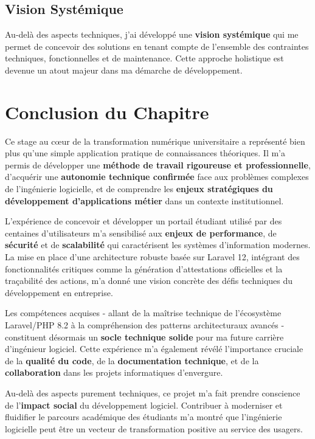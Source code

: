 \documentclass[12pt,a4paper]{report}
\begin{document}
\subsection{Vision Systémique}

Au-delà des aspects techniques, j'ai développé une \textbf{vision systémique} qui me permet de concevoir des solutions en tenant compte de l'ensemble des contraintes techniques, fonctionnelles et de maintenance. Cette approche holistique est devenue un atout majeur dans ma démarche de développement.

\section*{Conclusion du Chapitre}

Ce stage au cœur de la transformation numérique universitaire a représenté bien plus qu'une simple application pratique de connaissances théoriques. Il m'a permis de développer une \textbf{méthode de travail rigoureuse et professionnelle}, d'acquérir une \textbf{autonomie technique confirmée} face aux problèmes complexes de l'ingénierie logicielle, et de comprendre les \textbf{enjeux stratégiques du développement d'applications métier} dans un contexte institutionnel.

L'expérience de concevoir et développer un portail étudiant utilisé par des centaines d'utilisateurs m'a sensibilisé aux \textbf{enjeux de performance}, de \textbf{sécurité} et de \textbf{scalabilité} qui caractérisent les systèmes d'information modernes. La mise en place d'une architecture robuste basée sur Laravel 12, intégrant des fonctionnalités critiques comme la génération d'attestations officielles et la traçabilité des actions, m'a donné une vision concrète des défis techniques du développement en entreprise.

Les compétences acquises - allant de la maîtrise technique de l'écosystème Laravel/PHP 8.2 à la compréhension des patterns architecturaux avancés - constituent désormais un \textbf{socle technique solide} pour ma future carrière d'ingénieur logiciel. Cette expérience m'a également révélé l'importance cruciale de la \textbf{qualité du code}, de la \textbf{documentation technique}, et de la \textbf{collaboration} dans les projets informatiques d'envergure.

Au-delà des aspects purement techniques, ce projet m'a fait prendre conscience de l'\textbf{impact social} du développement logiciel. Contribuer à moderniser et fluidifier le parcours académique des étudiants m'a montré que l'ingénierie logicielle peut être un vecteur de transformation positive au service des usagers.
\end{document}
